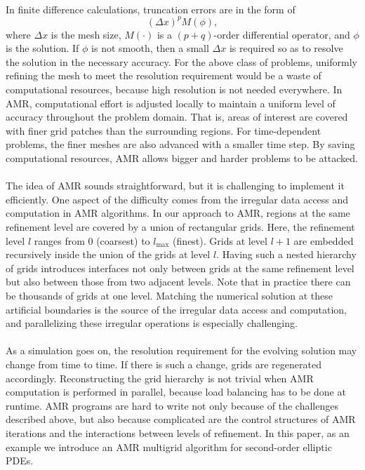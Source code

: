 \documentclass{ieee}
\numberwithin{equation}{section}
\begin{document}
\paragraph{}In finite difference calculations, truncation errors are in the form of 
$$(\Delta x)^pM(\phi),$$ 
where $\Delta x$ is the mesh size, $M(\cdot)$ is a $(p+q)$-order differential operator, and $\phi$ is the solution.  If $\phi$ is not smooth, then a small $\Delta x$ is required so as to resolve the solution in the necessary accuracy. For the  above class of problems, uniformly refining the mesh to meet the resolution requirement would be a waste of computational resources, because high resolution is not needed everywhere. In AMR, computational effort is adjusted locally to maintain a uniform level of accuracy throughout the problem domain. That is,  areas of interest are covered with finer grid patches than the surrounding regions. For time-dependent problems, the finer meshes are also advanced with a smaller time step. By saving computational resources, AMR allows bigger and  harder problems to be attacked. 

\paragraph{}The idea of AMR sounds straightforward, but it is challenging to implement it efficiently. One aspect of the difficulty comes from the  irregular data access and computation in AMR algorithms. In our approach to AMR, regions  at the same refinement level are covered by a union of rectangular grids.  Here, the refinement level $l$ ranges from $0$ (coarsest) to $l_{\text{max}}$ (finest). Grids at level $l+1$ are embedded recursively inside the union of the grids at level $l$. Having such a nested hierarchy of grids introduces interfaces not only between grids at the same refinement level  but also between those from two adjacent levels. Note that in practice there can be thousands of grids at one level. Matching the numerical solution at these artificial boundaries is the source of the irregular data access and computation, and parallelizing these irregular operations  is especially challenging.

\paragraph{}As a simulation goes on, the resolution requirement for the evolving solution may change from time to time. If there is such a change, grids are regenerated accordingly. Reconstructing the grid hierarchy is not trivial when AMR computation is performed in parallel, because load balancing has to be done at runtime. AMR programs are hard to write not only because of the challenges described above, but also because complicated are the control structures of AMR iterations and the interactions between levels of refinement. In this paper,  as an example we introduce an AMR multigrid algorithm for second-order elliptic PDEs.
\end{document}
